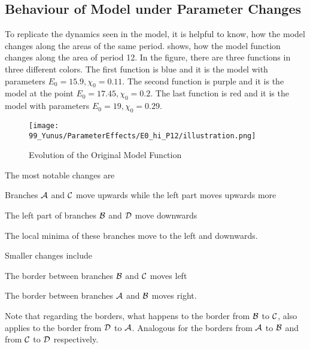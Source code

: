 \subsection{Behaviour of Model under Parameter Changes}

To replicate the dynamics seen in the model, it is helpful to know, how the model changes along the areas of the same period.
 shows, how the model function changes along the area of period 12.
In the figure, there are three functions in three different colors.
The first function is blue and it is the model with parameters $E_0 = 15.9, \chi_0 = 0.11$.
The second function is purple and it is the model at the point $E_0 = 17.45, \chi_0 = 0.2$.
The last function is red and it is the model with parameters $E_0 = 19, \chi_0 = 0.29$.

\begin{figure}
    \centering
    \texttt{[image: 99\_Yunus/ParameterEffects/E0\_hi\_P12/illustration.png]}
    \caption{Evolution of the Original Model Function}
    \label{fig:yunus.function.evolution}
\end{figure}

The most notable changes are
\begin{enumerate*}
    \item Branches $\mathcal{A}$ and $\mathcal{C}$ move upwards while the left part moves upwards more
    \item The left part of branches $\mathcal{B}$ and $\mathcal{D}$ move downwards 
    \item The local minima of these branches move to the left and downwards.
\end{enumerate*}
Smaller changes include
\begin{enumerate*}
    \item The border between branches $\mathcal{B}$ and $\mathcal{C}$ moves left
    \item The border between branches $\mathcal{A}$ and $\mathcal{B}$ moves right.
\end{enumerate*}
Note that regarding the borders, what happens to the border from $\mathcal{B}$ to $\mathcal{C}$, also applies to the border from $\mathcal{D}$ to $\mathcal{A}$.
Analogous for the borders from $\mathcal{A}$ to $\mathcal{B}$ and from $\mathcal{C}$ to $\mathcal{D}$ respectively.
